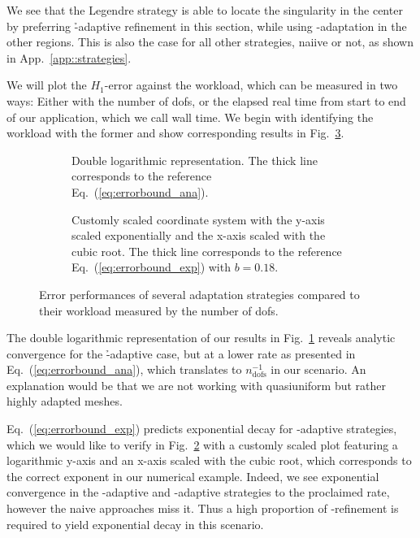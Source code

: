 We see that the Legendre strategy is able to locate the singularity in the center by preferring \h-adaptive refinement in this section, while using \p-adaptation in the other regions. This is also the case for all other strategies, naiive or not, as shown in App.~\ref{app::strategies}.

We will plot the $H_1$-error against the workload, which can be measured in two ways: Either with the number of \glspl{dof}, or the elapsed real time from start to end of our application, which we call wall time. We begin with identifying the workload with the former and show corresponding results in Fig.~\ref{fig:errordofs}.


\begin{figure}
\begin{subfigure}{1\textwidth}
  \centering
  \caption{Double logarithmic representation. The thick line corresponds to the reference Eq.~(\ref{eq:errorbound_ana}).}
  \label{fig:errordofsloglog}
\end{subfigure}
\begin{subfigure}{1\textwidth}
  \centering
  \caption{Customly scaled coordinate system with the y-axis scaled exponentially and the x-axis scaled with the cubic root. The thick line corresponds to the reference Eq.~(\ref{eq:errorbound_exp}) with $b = 0.18$.}
  \label{fig:errordofscustom}
\end{subfigure}
\caption{Error performances of several adaptation strategies compared to their workload measured by the number of \glspl{dof}.}
\label{fig:errordofs}
\end{figure}

The double logarithmic representation of our results in Fig.~\ref{fig:errordofsloglog} reveals analytic convergence for the \h-adaptive case, but at a lower rate as presented in Eq.~(\ref{eq:errorbound_ana}), which translates to $n_\text{dofs}^{-1}$ in our scenario. An explanation would be that we are not working with quasiuniform but rather highly adapted meshes.

Eq.~(\ref{eq:errorbound_exp}) predicts exponential decay for \hp-adaptive strategies, which we would like to verify in Fig.~\ref{fig:errordofscustom} with a customly scaled plot featuring a logarithmic y-axis and an x-axis scaled with the cubic root, which corresponds to the correct exponent in our numerical example. Indeed, we see exponential convergence in the \p-adaptive and \hp-adaptive strategies to the proclaimed rate, however the naive approaches miss it. Thus a high proportion of \p-refinement is required to yield exponential decay in this scenario.

